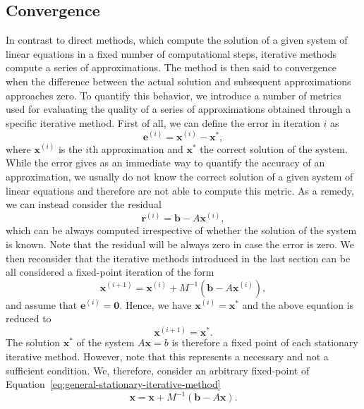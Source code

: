 \subsection{Convergence}
In contrast to direct methods, which compute the solution of a given system of linear equations in a fixed number of computational steps, iterative methods compute a series of approximations.
The method is then said to convergence when the difference between the actual solution and subsequent approximations approaches zero.
To quantify this behavior, we introduce a number of metrics used for evaluating the quality of a series of approximations obtained through a specific iterative method.
First of all, we can define the error in iteration $i$ as
\begin{equation*}
	\bm{e}^{(i)} = \bm{x}^{(i)} - \bm{x}^{*},
\end{equation*}
where $\bm{x}^{(i)}$ is the $i$th approximation and $\bm{x}^{*}$ the correct solution of the system.
While the error gives as an immediate way to quantify the accuracy of an approximation, we usually do not know the correct solution of a given system of linear equations and therefore are not able to compute this metric.
As a remedy, we can instead consider the residual
\begin{equation*}
	\bm{r}^{(i)} = \bm{b} - A \bm{x}^{(i)},
\end{equation*}
which can be always computed irrespective of whether the solution of the system is known.
Note that the residual will be always zero in case the error is zero.
We then reconsider that the iterative methods introduced in the last section can be all considered a fixed-point iteration of the form
\begin{equation}
	\bm{x}^{(i+1)} = \bm{x}^{(i)} + M^{-1}(\bm b - A \bm{x}^{(i)}),
\end{equation}
and assume that $\bm{e}^{(i)} = \bm{0}$.
Hence, we have $\bm{x}^{(i)} = \bm{x}^{*}$ and the above equation is reduced to
\begin{equation}
	\bm{x}^{(i+1)} = \bm{x}^{*}.
\end{equation}
The solution $\bm{x}^{*}$ of the system $A \bm{x} = b$ is therefore a fixed point of each stationary iterative method.
However, note that this represents a necessary and not a sufficient condition. 
We, therefore, consider an arbitrary fixed-point of Equation~\eqref{eq:general-stationary-iterative-method}
\begin{equation*}
	\bm{x} = \bm{x} + M^{-1}(\bm b - A \bm{x}).
\end{equation*}
